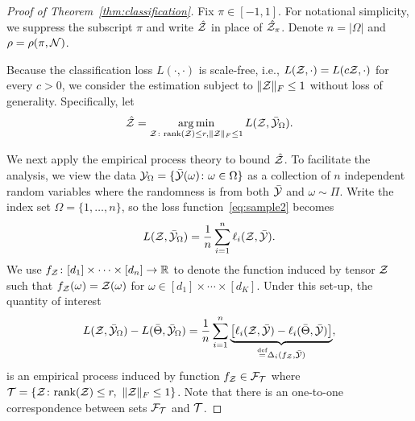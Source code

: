 \documentclass[11pt]{article}
\theoremstyle{plain}
\theoremstyle{definition}
\newcommand*{\KeepStyleUnderBrace}[1]{%
  \mathop{%
    \mathchoice
    {\underbrace{\displaystyle#1}}%
    {\underbrace{\textstyle#1}}%
    {\underbrace{\scriptstyle#1}}%
    {\underbrace{\scriptscriptstyle#1}}%
  }\limits
}
\def\rank{\textup{rank}}
\begin{document}
\begin{proof}[Proof of Theorem~\ref{thm:classification}]
Fix $\pi\in[-1,1]$. For notational simplicity, we suppress the subscript $\pi$ and write $\hat {\mathcal{Z}}$ in place of $\hat {\mathcal{Z}}_\pi$. Denote $n=|\Omega|$ and $\rho=\rho(\pi, \mathcal{N})$. 

Because the classification loss $L(\cdot, \cdot)$ is scale-free, i.e., $L(\mathcal{Z},\cdot)=L(c\mathcal{Z}, \cdot)$ for every $c>0$, we consider the estimation subject to $\lVert\mathcal{Z}\rVert_F\leq 1$ without loss of generality. Specifically, let
\[
\hat {\mathcal{Z}}=\operatorname*{arg\,min}_{\mathcal{Z}\colon \textup{rank}(\mathcal{Z})\leq r, \lVert\mathcal{Z}\rVert_F\leq 1}L(\mathcal{Z}, \bar {\mathcal{Y}}_{\Omega}).
\]

We next apply the empirical process theory to bound $\hat {\mathcal{Z}}$. To facilitate the analysis, we view the data $\mathcal{Y}_\Omega=\{\bar {\mathcal{Y}}(\omega)\colon \omega\in \Omega\}$ as a collection of $n$ independent random variables where the randomness is from both $\bar {\mathcal{Y}}$ and $\omega\sim\Pi$. Write the index set $\Omega=\{1,\ldots,n\}$, so the loss function~\eqref{eq:sample2} becomes
\[
L(\mathcal{Z},\bar {\mathcal{Y}}_\Omega)={1\over n}\sum_{i=1}^n\ell_{i}(\mathcal{Z}, \bar {\mathcal{Y}}).
\]
We use $f_{\mathcal{Z}} \colon [d_1]\times\cdots\times[d_n] \to \mathbb{R}$ to denote the function induced by tensor $\mathcal{Z}$ such that $f_{\mathcal{Z}}(\omega)=\mathcal{Z}(\omega)$ for $\omega\in[d_1]\times \cdots \times [d_K]$. Under this set-up, the quantity of interest
\begin{align}\label{eq:empirical}
 L(\tZ,\bar \tY_\Omega)-L(\bar \Theta,\bar \tY_\Omega)={1\over n}\sum_{i=1}^n \KeepStyleUnderBrace{\left[\ell_{i}(\tZ, \bar \tY)-\ell_{i}(\bar \Theta, \bar \tY)\right]}_{\stackrel{\text{def}}{=}\Delta_i(f_\tZ,\bar \tY)},
\end{align}
is an empirical process induced by function $f_{\mathcal{Z}}\in \mathcal{F}_{\mathcal{T}}$ where $\tT=\{\tZ\colon \rank(\tZ)\leq r, \ \FnormSize{}{\tZ}\leq 1\}$. Note that there is an one-to-one correspondence between sets $\mathcal{F}_{\mathcal{T}}$ and $\mathcal{T}$. 


\end{proof}
\end{document}
